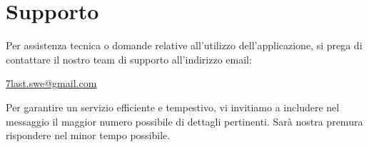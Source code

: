\section{Supporto}
Per assistenza tecnica o domande relative all’utilizzo dell’applicazione, si prega di contattare il nostro team di supporto all'indirizzo email: 
\begin{center}
    \href{mailto:7last.swe@gmail.com}{7last.swe@gmail.com}
\end{center} 
Per garantire un servizio efficiente e tempestivo, vi invitiamo a includere nel messaggio il maggior numero possibile di dettagli pertinenti. Sarà nostra premura rispondere nel minor tempo possibile.
